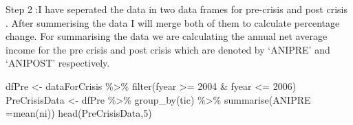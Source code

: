 \documentclass[
]{article}
\newenvironment{Shaded}{\begin{snugshade}}{\end{snugshade}}
\newcommand{\AttributeTok}[1]{\textcolor[rgb]{0.77,0.63,0.00}{#1}}
\newcommand{\DecValTok}[1]{\textcolor[rgb]{0.00,0.00,0.81}{#1}}
\newcommand{\FunctionTok}[1]{\textcolor[rgb]{0.00,0.00,0.00}{#1}}
\newcommand{\NormalTok}[1]{#1}
\newcommand{\OtherTok}[1]{\textcolor[rgb]{0.56,0.35,0.01}{#1}}
\newcommand{\SpecialCharTok}[1]{\textcolor[rgb]{0.00,0.00,0.00}{#1}}
\newcommand{\StringTok}[1]{\textcolor[rgb]{0.31,0.60,0.02}{#1}}
\begin{document}
\begin{Shaded}
\end{Shaded}

Step 2 :I have seperated the data in two data frames for pre-crisis and
post crisis . After summerising the data I will merge both of them to
calculate percentage change. For summarising the data we are calculating
the annual net average income for the pre crisis and post crisis which
are denoted by `ANIPRE' and `ANIPOST' respectively.

\begin{Shaded}
\begin{Highlighting}[]
\NormalTok{dfPre }\OtherTok{\textless{}{-}}\NormalTok{ dataForCrisis }\SpecialCharTok{\%\textgreater{}\%} \FunctionTok{filter}\NormalTok{(fyear }\SpecialCharTok{\textgreater{}=} \DecValTok{2004} \SpecialCharTok{\&}\NormalTok{ fyear }\SpecialCharTok{\textless{}=} \DecValTok{2006}\NormalTok{)}
\NormalTok{PreCrisisData  }\OtherTok{\textless{}{-}}\NormalTok{ dfPre }\SpecialCharTok{\%\textgreater{}\%} \FunctionTok{group\_by}\NormalTok{(tic) }\SpecialCharTok{\%\textgreater{}\%} \FunctionTok{summarise}\NormalTok{(}\AttributeTok{ANIPRE =}\FunctionTok{mean}\NormalTok{(ni))}
\FunctionTok{head}\NormalTok{(PreCrisisData,}\DecValTok{5}\NormalTok{)}
\end{Highlighting}
\end{Shaded}
\end{document}
